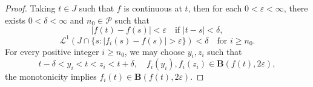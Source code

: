 \documentclass[10pt,a4paper]{amsart}
\begin{document}
\begin{proof}
    Taking $t \in J$ such that $f$ is continuous at $t$, then for each $0<\varepsilon<\infty$, there exists $0<\delta<\infty$ and 
    $n_0\in \mathscr P$ such that 
    \[ |f(t)-f(s)| < \varepsilon \quad \text{if $|t-s|<\delta$},\]
    \[ \mathscr L^1(J \cap \{ s : |f_i(s)-f(s)|>\varepsilon\}) < \delta \quad \text{for $i\geq n_0$}.\]
    For every positive integer $i\geq n_0$, we may
    choose $y_i,z_i$ such that 
    \[ t-\delta < y_i < t < z_i < t + \delta, \quad f_i(y_i),f_i(z_i) \in \mathbf B(f(t),2 \varepsilon),\]
    the monotonicity implies $f_i(t)\in \mathbf B(f(t),2\varepsilon)$.
\end{proof}
\end{document}
